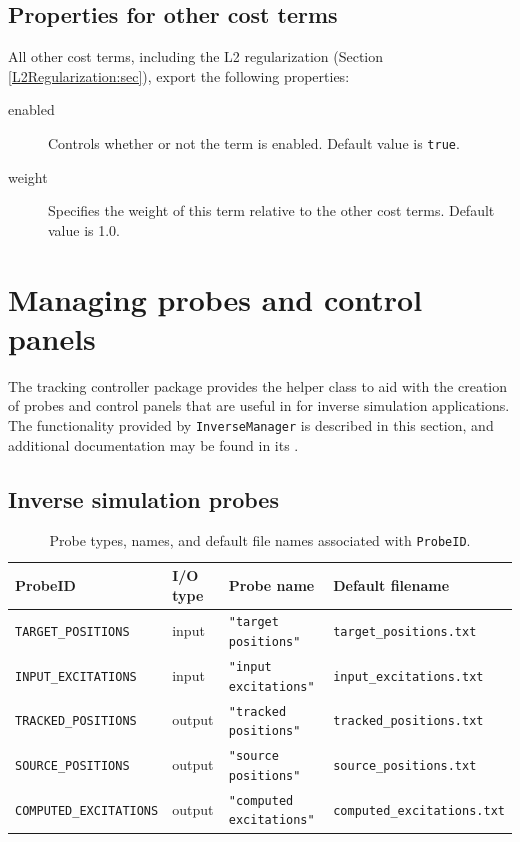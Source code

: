 \subsection{Properties for other cost terms}

All other cost terms, including the L2 regularization (Section
\ref{L2Regularization:sec}), export the following properties:

\begin{description}

\item[enabled]\mbox{}

Controls whether or not the term is enabled. Default value is {\tt true}.

\item[weight]\mbox{}

Specifies the weight of this term relative to the other cost terms. Default
value is 1.0.

\end{description}

\section{Managing probes and control panels}
\label{InverseManager:sec}

The tracking controller package provides the helper class
 to aid with the
creation of probes and control panels that are useful in for inverse simulation
applications. The functionality provided by {\tt InverseManager} is described
in this section, and additional documentation may be found in its
.

\subsection{Inverse simulation probes}
\label{InverseManagerProbes:sec}

\begin{table}[h]
\begin{center}
\begin{tabular}{|llll|}
\hline
ProbeID & I/O type & Probe name & Default filename \\
\hline
{\tt TARGET\_POSITIONS} & input & {\tt "target positions"} &
{\tt target\_positions.txt} \\
{\tt INPUT\_EXCITATIONS} & input & {\tt "input excitations"} &
{\tt input\_excitations.txt} \\
{\tt TRACKED\_POSITIONS} & output & {\tt "tracked positions"} &
{\tt tracked\_positions.txt} \\
{\tt SOURCE\_POSITIONS} & output & {\tt "source positions"} &
{\tt source\_positions.txt} \\
{\tt COMPUTED\_EXCITATIONS} & output & {\tt "computed excitations"} &
{\tt computed\_excitations.txt} \\
\hline
\end{tabular}
\end{center}
\caption{Probe types, names, and default file names associated 
with {\tt ProbeID}.}
\label{ProbeData:tab}
\end{table}

